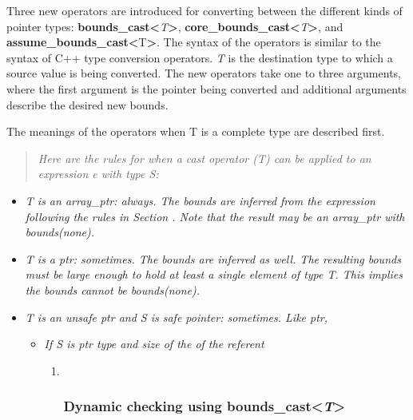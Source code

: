 Three new operators are introduced for converting between the different
kinds of pointer types:
\textbf{bounds\_cast\textless{}}\emph{T}\textbf{\textgreater{}},
\textbf{core\_bounds\_cast\textless{}}\emph{T}\textbf{\textgreater{}},
and \textbf{assume\_bounds\_cast\textless{}}T\textbf{\textgreater{}}.
The syntax of the operators is similar to the syntax of C++ type
conversion operators. \emph{T} is the destination type to which a source
value is being converted. The new operators take one to three arguments,
where the first argument is the pointer being converted and additional
arguments describe the desired new bounds.

The meanings of the operators when T is a complete type are described
first.

\begin{quote}
\emph{Here are the rules for when a cast operator (T) can be applied to
an expression e with type S:}
\end{quote}

\begin{itemize}
\item
  \emph{T is an array\_ptr: always. The bounds are inferred from the
  expression following the rules in Section . Note that the result may
  be an array\_ptr with bounds(none).}
\item
  \emph{T is a ptr: sometimes. The bounds are inferred as well. The
  resulting bounds must be large enough to hold at least a single
  element of type T. This implies the bounds cannot be bounds(none).}
\item
  \emph{T is an unsafe ptr and S is safe pointer: sometimes. Like ptr, }

  \begin{itemize}
  \item
    \emph{If S is ptr type and size of the of the referent }

    \begin{enumerate}
    \def\labelenumi{\arabic{enumi}.}
    \item ~
      \subsubsection{\texorpdfstring{\protect\hypertarget{ux5fToc437460797}{}{\protect\hypertarget{ux5fToc440445478}{}{\protect\hypertarget{ux5fToc440449260}{}{\protect\hypertarget{ux5fToc440551910}{}{}}}}Dynamic
      checking using
      bounds\_cast\textless{}\emph{T}\textgreater{}}{Dynamic checking using bounds\_cast\textless{}T\textgreater{}}}\label{dynamic-checking-using-boundsux5fcastt}
    \end{enumerate}
  \end{itemize}
\end{itemize}

